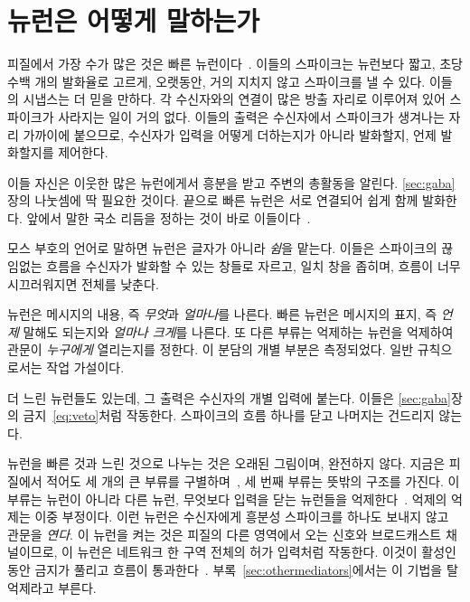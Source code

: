 \section{ 뉴런은 어떻게 말하는가}

피질에서 가장 수가 많은 것은 빠른  뉴런이다~\cite{Tremblay2016}. 이들의 스파이크는  뉴런보다 짧고, 초당 수백 개의 발화율로 고르게, 오랫동안, 거의 지치지 않고 스파이크를 낼 수 있다. 이들의 시냅스는 더 믿을 만하다. 각 수신자와의 연결이 많은 방출 자리로 이루어져 있어 스파이크가 사라지는 일이 거의 없다. 이들의 출력은 수신자에서 스파이크가 생겨나는 자리 가까이에 붙으므로, 수신자가 입력을 어떻게 더하는지가 아니라 발화할지, 언제 발화할지를 제어한다.

이들 자신은 이웃한 많은  뉴런에게서 흥분을 받고 주변의 총활동을 알린다. \ref{sec:gaba}장의 나눗셈에 딱 필요한 것이다. 끝으로 빠른  뉴런은 서로 연결되어 쉽게 함께 발화한다. 앞에서 말한 국소 리듬을 정하는 것이 바로 이들이다~\cite{Cardin2009}.

모스 부호의 언어로 말하면  뉴런은 글자가 아니라 \emph{쉼}을 맡는다. 이들은  스파이크의 끊임없는 흐름을 수신자가 발화할 수 있는 창들로 자르고, 일치 창을 좁히며, 흐름이 너무 시끄러워지면 전체를 낮춘다.

\begin{keyblock}
\begin{proposition}[역할 분담]
\label{prop:punctuation}
 뉴런은 메시지의 내용, 즉 \emph{무엇}과 \emph{얼마나}를 나른다. 빠른  뉴런은 메시지의 표지, 즉 \emph{언제} 말해도 되는지와 \emph{얼마나 크게}를 나른다. 또 다른 부류는 억제하는 뉴런을 억제하여 관문이 \emph{누구에게} 열리는지를 정한다. 이 분담의 개별 부분은 측정되었다. 일반 규칙으로서는 작업 가설이다.
\end{proposition}
\end{keyblock}

더 느린  뉴런들도 있는데, 그 출력은 수신자의 개별 입력에 붙는다. 이들은 \ref{sec:gaba}장의 금지~\eqref{eq:veto}처럼 작동한다.  스파이크의 흐름 하나를 닫고 나머지는 건드리지 않는다.

 뉴런을 빠른 것과 느린 것으로 나누는 것은 오래된 그림이며, 완전하지 않다. 지금은 피질에서 적어도 세 개의 큰 부류를 구별하며~\cite{Tremblay2016}, 세 번째 부류는 뜻밖의 구조를 가진다. 이 부류는  뉴런이 아니라 다른  뉴런, 무엇보다 입력을 닫는 뉴런들을 억제한다~\cite{Pfeffer2013}. 억제의 억제는 이중 부정이다. 이런 뉴런은 수신자에게 흥분성 스파이크를 하나도 보내지 않고 관문을 \emph{연다}. 이 뉴런을 켜는 것은 피질의 다른 영역에서 오는 신호와 브로드캐스트 채널이므로, 이 뉴런은 네트워크 한 구역 전체의 허가 입력처럼 작동한다. 이것이 활성인 동안 금지가 풀리고 흐름이 통과한다~\cite{Pi2013}. 부록~\ref{sec:othermediators}에서는 이 기법을 탈억제라고 부른다.
